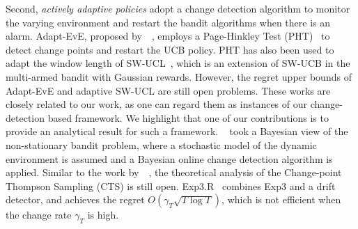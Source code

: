 \documentclass[letterpaper]{article} %
\newcommand{\blue}{}
\begin{document}
Second, {\em actively adaptive policies} adopt a change detection algorithm to monitor the varying environment and restart the bandit algorithms when there is an alarm. Adapt-EvE, proposed by~\citeauthor{hartland2007change}~, employs a Page-Hinkley Test (PHT)~\cite{hinkley1971inference} to detect change points and restart the UCB policy. PHT has also been used to adapt the window length of SW-UCL~\cite{srivastava2014surveillance}, which is an extension of SW-UCB in the multi-armed bandit with Gaussian rewards. However, the regret upper bounds of Adapt-EvE and adaptive SW-UCL are still open problems. These works are closely related to our work, as one can regard them as instances of our change-detection based framework. We highlight that one of our contributions is to provide an analytical result for such a framework. \citeauthor{mellor2013thompson}~ took a Bayesian view of the non-stationary bandit problem, where a stochastic model of the dynamic environment is assumed and a Bayesian online change detection algorithm is applied. Similar to the work by~\citeauthor{hartland2007change}~, the theoretical analysis of the Change-point Thompson Sampling (CTS) is still open. Exp3.R~\cite{allesiardo2015exp3} combines Exp3 and a drift detector, and achieves the regret $O(\gamma_T \sqrt{T\log T})$, which is not efficient when the change rate $\gamma_T$ is high.
\end{document}

